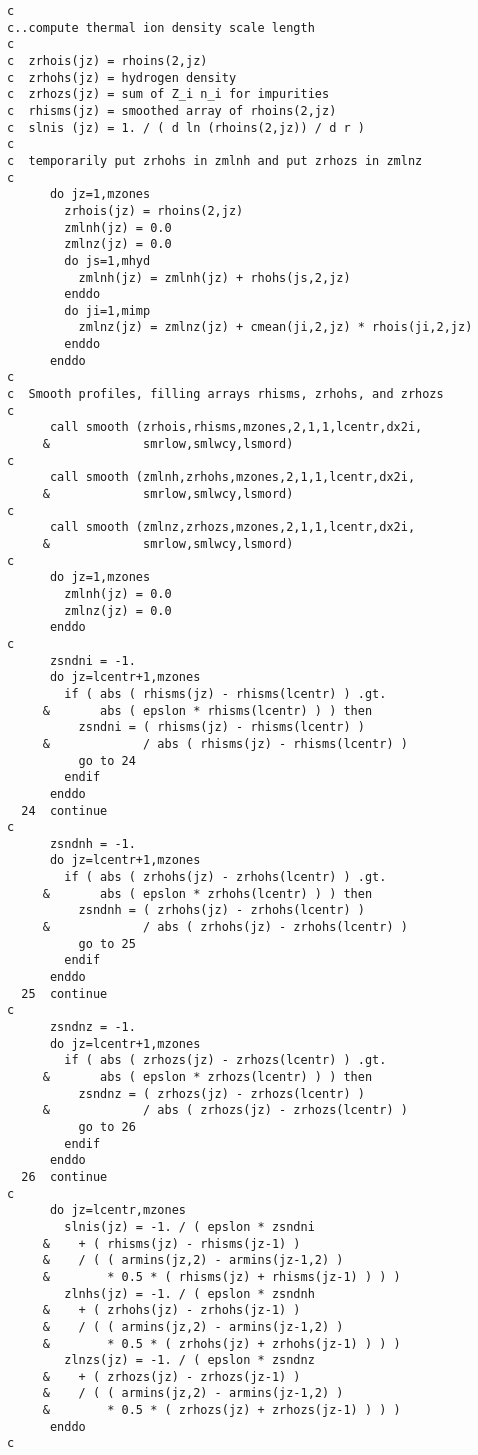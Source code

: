 \begin{verbatim}
c
c..compute thermal ion density scale length
c
c  zrhois(jz) = rhoins(2,jz)
c  zrhohs(jz) = hydrogen density
c  zrhozs(jz) = sum of Z_i n_i for impurities
c  rhisms(jz) = smoothed array of rhoins(2,jz)
c  slnis (jz) = 1. / ( d ln (rhoins(2,jz)) / d r )
c
c  temporarily put zrhohs in zmlnh and put zrhozs in zmlnz
c
      do jz=1,mzones
        zrhois(jz) = rhoins(2,jz)
        zmlnh(jz) = 0.0
        zmlnz(jz) = 0.0
        do js=1,mhyd
          zmlnh(jz) = zmlnh(jz) + rhohs(js,2,jz)
        enddo
        do ji=1,mimp
          zmlnz(jz) = zmlnz(jz) + cmean(ji,2,jz) * rhois(ji,2,jz)
        enddo
      enddo
c
c  Smooth profiles, filling arrays rhisms, zrhohs, and zrhozs
c
      call smooth (zrhois,rhisms,mzones,2,1,1,lcentr,dx2i,
     &             smrlow,smlwcy,lsmord)
c
      call smooth (zmlnh,zrhohs,mzones,2,1,1,lcentr,dx2i,
     &             smrlow,smlwcy,lsmord)
c
      call smooth (zmlnz,zrhozs,mzones,2,1,1,lcentr,dx2i,
     &             smrlow,smlwcy,lsmord)
c
      do jz=1,mzones
        zmlnh(jz) = 0.0
        zmlnz(jz) = 0.0
      enddo
c
      zsndni = -1.
      do jz=lcentr+1,mzones
        if ( abs ( rhisms(jz) - rhisms(lcentr) ) .gt.
     &       abs ( epslon * rhisms(lcentr) ) ) then
          zsndni = ( rhisms(jz) - rhisms(lcentr) )
     &             / abs ( rhisms(jz) - rhisms(lcentr) )
          go to 24
        endif
      enddo
  24  continue
c
      zsndnh = -1.
      do jz=lcentr+1,mzones
        if ( abs ( zrhohs(jz) - zrhohs(lcentr) ) .gt.
     &       abs ( epslon * zrhohs(lcentr) ) ) then
          zsndnh = ( zrhohs(jz) - zrhohs(lcentr) )
     &             / abs ( zrhohs(jz) - zrhohs(lcentr) )
          go to 25
        endif
      enddo
  25  continue
c
      zsndnz = -1.
      do jz=lcentr+1,mzones
        if ( abs ( zrhozs(jz) - zrhozs(lcentr) ) .gt.
     &       abs ( epslon * zrhozs(lcentr) ) ) then
          zsndnz = ( zrhozs(jz) - zrhozs(lcentr) )
     &             / abs ( zrhozs(jz) - zrhozs(lcentr) )
          go to 26
        endif
      enddo
  26  continue
c
      do jz=lcentr,mzones
        slnis(jz) = -1. / ( epslon * zsndni
     &    + ( rhisms(jz) - rhisms(jz-1) )
     &    / ( ( armins(jz,2) - armins(jz-1,2) )
     &        * 0.5 * ( rhisms(jz) + rhisms(jz-1) ) ) )
        zlnhs(jz) = -1. / ( epslon * zsndnh
     &    + ( zrhohs(jz) - zrhohs(jz-1) )
     &    / ( ( armins(jz,2) - armins(jz-1,2) )
     &        * 0.5 * ( zrhohs(jz) + zrhohs(jz-1) ) ) )
        zlnzs(jz) = -1. / ( epslon * zsndnz
     &    + ( zrhozs(jz) - zrhozs(jz-1) )
     &    / ( ( armins(jz,2) - armins(jz-1,2) )
     &        * 0.5 * ( zrhozs(jz) + zrhozs(jz-1) ) ) )
      enddo
c
\end{verbatim}

